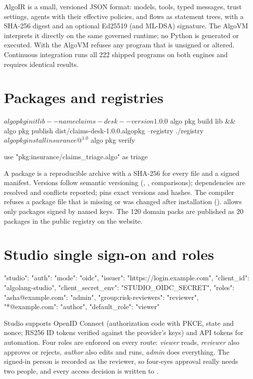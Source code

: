 AlgoIR is a small, versioned JSON format: models, tools, typed messages, trust settings, agents with their effective policies, and flows as statement trees, with a SHA-256 digest and an optional Ed25519 (and ML-DSA) signature. The AlgoVM interprets it directly on the same governed runtime; no Python is generated or executed. With  the AlgoVM refuses any program that is unsigned or altered. Continuous integration runs all 222 shipped programs on both engines and requires identical results.

\section{Packages and registries}

\begin{terminal}
$ algo pkg init lib --name claims-desk --version 1.0.0
$ algo pkg build lib && algo pkg publish dist/claims-desk-1.0.0.algopkg --registry ./registry
$ algo pkg install insurance@^1.0
$ algo pkg verify
\end{terminal}

\begin{algo}[title=Using an installed package]
use "pkg:insurance/claims_triage.algo" as triage
\end{algo}

A package is a reproducible  archive with a SHA-256 for every file and a signed manifest. Versions follow semantic versioning (, , comparisons); dependencies are resolved and conflicts reported;  pins exact versions and hashes. The compiler refuses a package file that is missing or was changed after installation ().  allows only packages signed by named keys. The 120 domain packs are published as 20 packages in the public registry on the website.

\section{Studio single sign-on and roles}

\begin{plaincode}[title=algo.config.json]
"studio": {
  "auth": {"mode": "oidc", "issuer": "https://login.example.com", "client_id": "algolang-studio",
           "client_secret_env": "STUDIO_OIDC_SECRET"},
  "roles": {"asha@example.com": "admin", "group:risk-reviewers": "reviewer", "*@example.com": "author"},
  "default_role": "viewer"
}
\end{plaincode}

Studio supports OpenID Connect (authorization code with PKCE, state and nonce; RS256 ID tokens verified against the provider's keys) and API tokens for automation. Four roles are enforced on every route: \emph{viewer} reads, \emph{reviewer} also approves or rejects, \emph{author} also edits and runs, \emph{admin} does everything. The signed-in person is recorded as the reviewer, so four-eyes approval really needs two people, and every access decision is written to .
